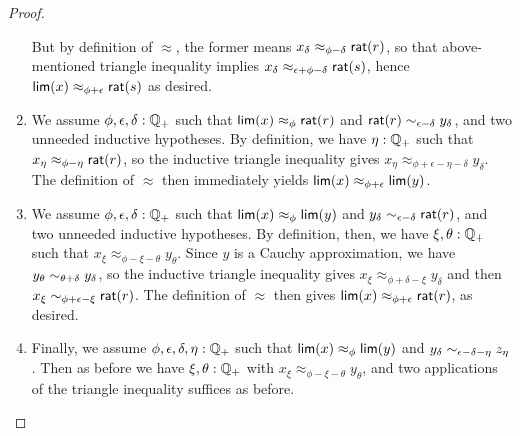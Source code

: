 \begin{proof}
\begin{enumerate}
    But by definition of $\approx$, the former means $x_\delta \approx_{\phi-\delta} \mathsf{rat}(r)$, so that above-mentioned triangle inequality implies $x_\delta \approx_{\epsilon+\phi-\delta} \mathsf{rat}(s)$, hence $\mathsf{lim}(x)\approx_{\phi+\epsilon} \mathsf{rat}(s)$ as desired.
  \item We assume $\phi,\epsilon,\delta:\mathbb{Q}_{+}$ such that $\mathsf{lim}(x)\approx_\phi \mathsf{rat}(r)$ and $\mathsf{rat}(r) \sim_{\epsilon-\delta} y_\delta$, and two unneeded inductive hypotheses.
    By definition, we have $\eta:\mathbb{Q}_{+}$ such that $x_\eta \approx_{\phi-\eta} \mathsf{rat}(r)$, so the inductive triangle inequality gives $x_\eta \approx_{\phi+\epsilon-\eta-\delta} y_\delta$.
    The definition of $\approx$ then immediately yields $\mathsf{lim}(x) \approx_{\phi+\epsilon} \mathsf{lim}(y)$.
  \item We assume $\phi,\epsilon,\delta:\mathbb{Q}_{+}$ such that $\mathsf{lim}(x)\approx_\phi \mathsf{lim}(y)$ and $y_\delta \sim_{\epsilon-\delta} \mathsf{rat}(r)$, and two unneeded inductive hypotheses.
    By definition, then, we have $\xi,\theta:\mathbb{Q}_{+}$ such that $x_\xi \approx_{\phi-\xi-\theta} y_\theta$.
    Since $y$ is a Cauchy approximation, we have $y_\theta \sim_{\theta+\delta} y_\delta$, so the inductive triangle inequality gives $x_\xi \approx_{\phi+\delta-\xi} y_\delta$ and then $x_\xi \sim_{\phi+\epsilon-\xi} \mathsf{rat}(r)$.
    The definition of $\approx$ then gives $\mathsf{lim}(x) \approx_{\phi+\epsilon}\mathsf{rat}(r)$, as desired.
  \item Finally, we assume $\phi,\epsilon,\delta,\eta:\mathbb{Q}_{+}$ such that $\mathsf{lim}(x)\approx_\phi \mathsf{lim}(y)$ and $y_\delta \sim_{\epsilon-\delta-\eta} z_\eta$.
    Then as before we have $\xi,\theta:\mathbb{Q}_{+}$ with $x_\xi \approx_{\phi-\xi-\theta} y_\theta$, and two applications of the triangle inequality suffices as before.
  \end{enumerate}


\end{proof}
